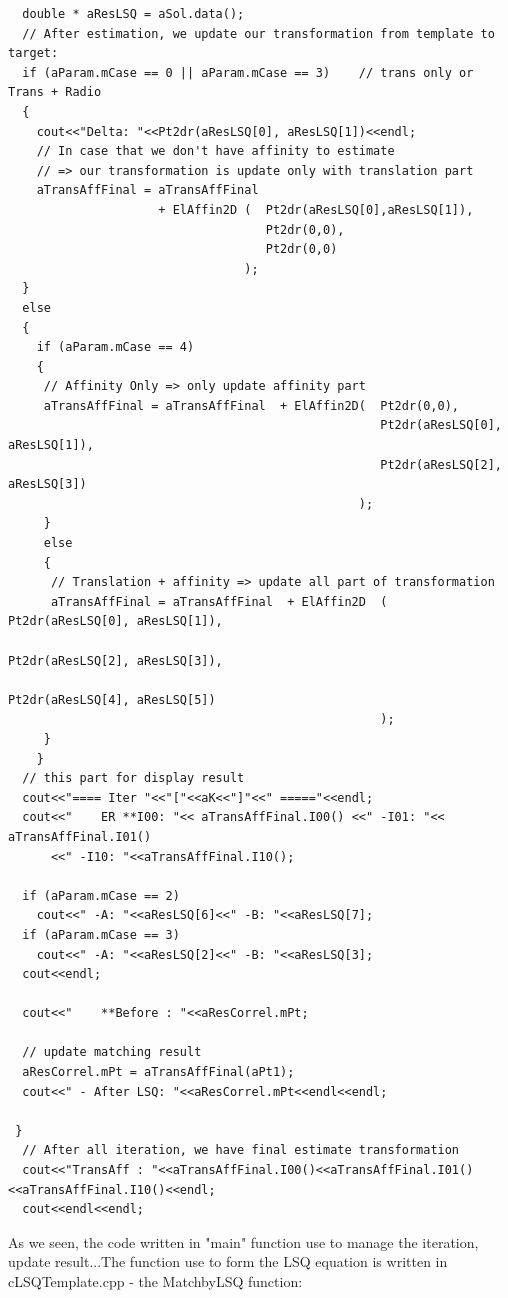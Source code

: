 \documentclass[twoside]{article}
\begin{document}
\begin{lstlisting}
  double * aResLSQ = aSol.data();
  // After estimation, we update our transformation from template to target:
  if (aParam.mCase == 0 || aParam.mCase == 3)    // trans only or Trans + Radio
  {
    cout<<"Delta: "<<Pt2dr(aResLSQ[0], aResLSQ[1])<<endl;
    // In case that we don't have affinity to estimate
    // => our transformation is update only with translation part
    aTransAffFinal = aTransAffFinal 
                     + ElAffin2D (  Pt2dr(aResLSQ[0],aResLSQ[1]),
                                    Pt2dr(0,0),
                                    Pt2dr(0,0)
                                 );
  }
  else
  {
    if (aParam.mCase == 4) 
    {
     // Affinity Only => only update affinity part
     aTransAffFinal = aTransAffFinal  + ElAffin2D(  Pt2dr(0,0),
                                                    Pt2dr(aResLSQ[0], aResLSQ[1]),
                                                    Pt2dr(aResLSQ[2], aResLSQ[3])
                                                 );
     }
     else
     {
      // Translation + affinity => update all part of transformation                    
      aTransAffFinal = aTransAffFinal  + ElAffin2D  ( Pt2dr(aResLSQ[0], aResLSQ[1]),
                                                      Pt2dr(aResLSQ[2], aResLSQ[3]),
                                                      Pt2dr(aResLSQ[4], aResLSQ[5])
                                                    );
     }
    }
  // this part for display result
  cout<<"==== Iter "<<"["<<aK<<"]"<<" ====="<<endl;
  cout<<"    ER **I00: "<< aTransAffFinal.I00() <<" -I01: "<< aTransAffFinal.I01() 
      <<" -I10: "<<aTransAffFinal.I10();
  
  if (aParam.mCase == 2)
    cout<<" -A: "<<aResLSQ[6]<<" -B: "<<aResLSQ[7];
  if (aParam.mCase == 3)
    cout<<" -A: "<<aResLSQ[2]<<" -B: "<<aResLSQ[3];
  cout<<endl;

  cout<<"    **Before : "<<aResCorrel.mPt;

  // update matching result
  aResCorrel.mPt = aTransAffFinal(aPt1);
  cout<<" - After LSQ: "<<aResCorrel.mPt<<endl<<endl;

 }
  // After all iteration, we have final estimate transformation
  cout<<"TransAff : "<<aTransAffFinal.I00()<<aTransAffFinal.I01()<<aTransAffFinal.I10()<<endl;
  cout<<endl<<endl;
\end{lstlisting}

As we seen, the code written in "main" function use to manage the iteration, update result...The function use to form the LSQ equation is written in {\color{blue}cLSQTemplate.cpp} - the {\color{blue}MatchbyLSQ} function: 
\end{document}
